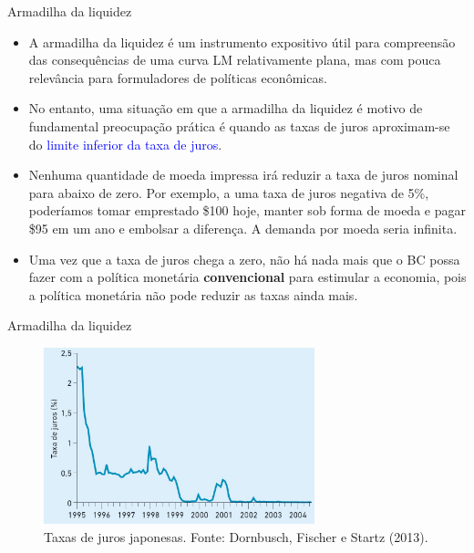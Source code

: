 \documentclass[10pt]{beamer}
\begin{document}
\begin{frame}{Armadilha da liquidez}
\begin{itemize}
    \item A armadilha da liquidez é um instrumento expositivo útil para compreensão das consequências de uma curva LM relativamente plana, mas com pouca relevância para formuladores de políticas econômicas.
    \bigskip
    \item No entanto, uma situação em que a armadilha da liquidez é motivo de fundamental preocupação prática é quando as taxas de juros aproximam-se do \textcolor{blue}{limite inferior da taxa de juros}.
    \bigskip
    \item Nenhuma quantidade de moeda impressa irá reduzir a taxa de juros nominal para abaixo de zero. Por exemplo, a uma taxa de juros negativa de 5\%, poderíamos tomar emprestado \$100 hoje, manter sob forma de moeda e pagar \$95 em um ano e embolsar a diferença. A demanda por moeda seria infinita.
    \bigskip
    \item Uma vez que a taxa de juros chega a zero, não há nada mais que o BC possa fazer com a política monetária \textbf{convencional} para estimular a economia, pois a política monetária não pode reduzir as taxas ainda mais.
\end{itemize}
\end{frame}

\begin{frame}{Armadilha da liquidez}
\begin{figure}
    \centering
    \includegraphics[width=0.7\textwidth]{./figures/aula102_fig3.JPG}
    \caption{Taxas de juros japonesas. Fonte: Dornbusch, Fischer e Startz (2013).}
    \label{fig3}
\end{figure}
\end{frame}
\end{document}
